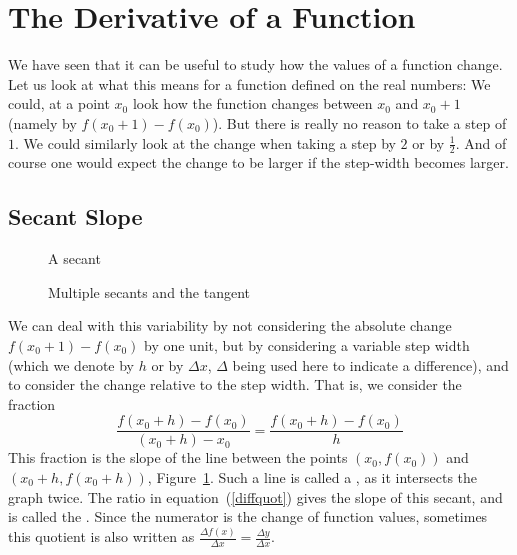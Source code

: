 \section{The Derivative of a Function}

We have seen that it can be useful to study how the values of a function
change. Let us look at what this means for a function defined on the real
numbers: We could, at a point $x_0$ look how the function changes between
$x_0$ and $x_0+1$ (namely by $f(x_0+1)-f(x_0)$). But there is really no
reason to take a step of $1$. We could similarly look at the change when
taking a step by $2$ or by $\frac{1}{2}$. And of course one would expect the
change to be larger if the step-width becomes larger.

\subsection{Secant Slope}

\begin{figure}
\begin{center}
\end{center}
\caption{A secant}
\label{figonesecant}
\end{figure}

\begin{figure}
\begin{center}
\end{center}
\caption{Multiple secants and the tangent}
\label{figsecantslopes}
\end{figure}

We can deal with this variability by not considering the absolute change
$f(x_0+1)-f(x_0)$ by one unit, but by
considering a variable step width (which we denote by $h$ or by
$\Delta x$, $\Delta$ being used here to indicate a difference), and to
consider the change relative to the step width. That is, we consider the
fraction
\begin{equation}
\frac{f(x_0+h)-f(x_0)}{(x_0+h)-x_0}=\frac{f(x_0+h)-f(x_0)}{h}
\label{diffquot}
\end{equation}
This fraction is the slope of the line between the points $(x_0,f(x_0))$ and
$(x_0+h,f(x_0+h))$, Figure~\ref{figonesecant}. Such a line is called a , as it intersects the graph
twice. The ratio in equation~(\ref{diffquot}) gives the slope of this secant, and
is called the .
Since the numerator is the change of
function values, sometimes this quotient is also written as $\displaystyle
\frac{\Delta f(x)}{\Delta x}= \frac{\Delta y}{\Delta x}$.

